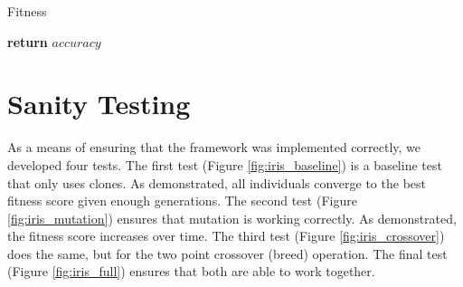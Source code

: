 \documentclass[12pt, final]{dalcsthesis}
\begin{document}
\begin{algorithm}[hb]
	\caption{Fitness}
	\label{alg:fitness-baseline}
	\begin{algorithmic}[1]
		\EndIf
		\EndFor
		\State \textbf{return} $accuracy$
		\EndProcedure
	\end{algorithmic}
\end{algorithm}

\section{Sanity Testing}
As a means of ensuring that the framework was implemented correctly, we developed four tests.
The first test (Figure \ref{fig:iris_baseline}) is a baseline test that only uses clones. As demonstrated,
all individuals converge to the best fitness score given enough generations. The second test (Figure \ref{fig:iris_mutation})
ensures that mutation is working correctly. As demonstrated, the fitness score increases over time. The third test (Figure \ref{fig:iris_crossover})
does the same, but for the two point crossover (breed) operation. The final test (Figure \ref{fig:iris_full}) ensures that both
are able to work together.
\end{document}
